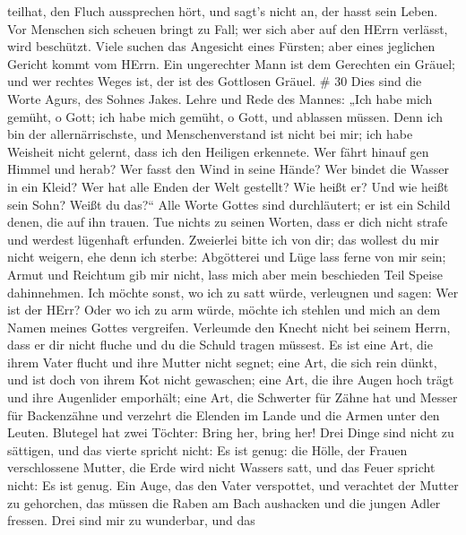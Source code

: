teilhat, den Fluch aussprechen hört, und sagt's nicht an, der hasst sein
Leben.  Vor Menschen sich scheuen bringt zu Fall; wer sich
aber auf den HErrn verlässt, wird beschützt.  Viele suchen
das Angesicht eines Fürsten; aber eines jeglichen Gericht kommt vom
HErrn.  Ein ungerechter Mann ist dem Gerechten ein Gräuel;
und wer rechtes Weges ist, der ist des Gottlosen Gräuel. \# 30
 Dies sind die Worte Agurs, des Sohnes Jakes. Lehre und Rede
des Mannes: „Ich habe mich gemüht, o Gott; ich habe mich gemüht, o Gott,
und ablassen müssen.  Denn ich bin der allernärrischste, und
Menschenverstand ist nicht bei mir;  ich habe Weisheit nicht
gelernt, dass ich den Heiligen erkennete.  Wer fährt hinauf
gen Himmel und herab? Wer fasst den Wind in seine Hände? Wer bindet die
Wasser in ein Kleid? Wer hat alle Enden der Welt gestellt? Wie heißt er?
Und wie heißt sein Sohn? Weißt du das?{}``  Alle Worte
Gottes sind durchläutert; er ist ein Schild denen, die auf ihn trauen.
 Tue nichts zu seinen Worten, dass er dich nicht strafe und
werdest lügenhaft erfunden.  Zweierlei bitte ich von dir;
das wollest du mir nicht weigern, ehe denn ich sterbe: 
Abgötterei und Lüge lass ferne von mir sein; Armut und Reichtum gib mir
nicht, lass mich aber mein beschieden Teil Speise dahinnehmen.
 Ich möchte sonst, wo ich zu satt würde, verleugnen und
sagen: Wer ist der HErr? Oder wo ich zu arm würde, möchte ich stehlen
und mich an dem Namen meines Gottes vergreifen.  Verleumde
den Knecht nicht bei seinem Herrn, dass er dir nicht fluche und du die
Schuld tragen müssest.  Es ist eine Art, die ihrem Vater
flucht und ihre Mutter nicht segnet;  eine Art, die sich
rein dünkt, und ist doch von ihrem Kot nicht gewaschen; 
eine Art, die ihre Augen hoch trägt und ihre Augenlider emporhält;
 eine Art, die Schwerter für Zähne hat und Messer für
Backenzähne und verzehrt die Elenden im Lande und die Armen unter den
Leuten.  Blutegel hat zwei Töchter: Bring her, bring her!
Drei Dinge sind nicht zu sättigen, und das vierte spricht nicht: Es ist
genug:  die Hölle, der Frauen verschlossene Mutter, die
Erde wird nicht Wassers satt, und das Feuer spricht nicht: Es ist genug.
 Ein Auge, das den Vater verspottet, und verachtet der
Mutter zu gehorchen, das müssen die Raben am Bach aushacken und die
jungen Adler fressen.  Drei sind mir zu wunderbar, und das
